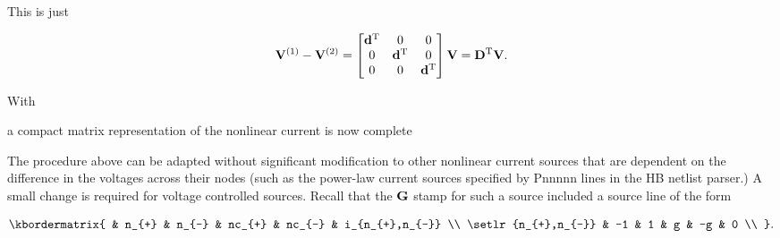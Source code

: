 This is just

\begin{equation}\label{eqn:ece1254projectReport:1400}
\BV^{(1)} - \BV^{(2)}
=
\begin{bmatrix}
\Bd^\T & 0 & 0 \\
0 & \Bd^\T & 0 \\
0 & 0 & \Bd^\T \\
\end{bmatrix}
\BV
= \BD^\T \BV.
\end{equation}

With

a compact matrix representation of the nonlinear current is now complete



The procedure above can be adapted without significant modification to other nonlinear current sources that are dependent on the difference in the voltages across their nodes (such as the power-law current sources specified by Pnnnnn lines in the HB netlist parser.)  A small change is required for voltage controlled sources.  Recall that the \( \mathbf{G} \) stamp for such a source included a source line of the form

\begin{equation}\label{eqn:ece1254projectReport:1121}
\kbordermatrix{
        & n_{+} & n_{-} & nc_{+} & nc_{-} &  i_{n_{+},n_{-}} \\
\setlr{n_{+},n_{-}}        &    -1 & 1 & g & -g   & 0 \\
}.
\end{equation}

